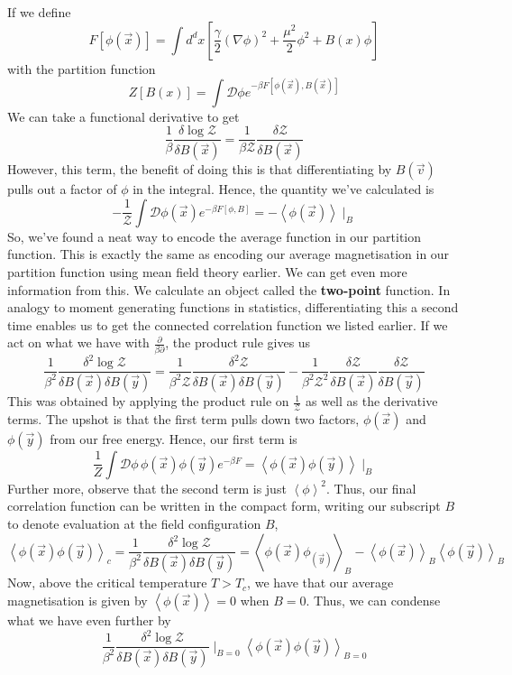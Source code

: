 \documentclass[11pt, oneside]{article}   	%
\begin{document}
If we define 
\[
	F[ \phi ( \vec{x} ) ] = \int d^{  d} x \left[ \frac{\gamma}{2 } ( \nabla \phi)^ 2 + \frac{\mu^2 }{2 } \phi^2 + B ( x) \phi  \right] 
\] with the partition function 
\[
	Z [ B ( x) ] = \int \mathcal{ D } \phi e^{  - \beta  F [ \phi ( \vec{x} ), B ( \vec{x} ) ]}
\] We can take a functional derivative to get
\[
	\frac{1}{\beta } \frac{\delta \log \mathcal{ Z }}{\delta B ( \vec{x} ) } = \frac{1}{\beta \mathcal{ Z }} \frac{ \delta \mathcal{ Z }}{ \delta B ( \vec{x} ) }
\] However, this term, the benefit of doing this is that differentiating by $B ( \vec{v} ) $ pulls out a factor of $ \phi $ in the integral. Hence, the quantity we've calculated is 
\[
	- \frac{1}{\mathcal{ Z } } \int \mathcal{ D } \phi ( \vec{x})  e^{  - \beta F[ \phi , B  ] } =  - \left< \phi ( \vec{x} )  \right> \mid_{ B }
\] So, we've found a neat way to encode the average function in our partition function. 
This is exactly the same as encoding our average magnetisation 
in our partition function using mean field theory earlier. 
We can get even more information from this. We calculate an object called the \textbf{two-point} function. 
In analogy to moment generating functions in statistics, 
differentiating this a second time enables us to get the connected 
correlation function we listed earlier. If we act on what we have 
with $  \frac{ \partial  }{ \beta \partial  }$, the product rule gives us 
\[
	\frac{1}{ \beta ^ 2 } \frac{\delta^ 2   \log \mathcal{  Z} }{\delta B ( \vec{x} ) \delta B ( \vec{y} ) } = \frac{1}{ \beta ^ 2 \mathcal{ Z } } \frac{ \delta ^2 \mathcal{ Z } }{\delta B ( \vec{x} ) \delta B ( \vec{y} ) }  - \frac{1}{ \beta ^ 2 \mathcal{Z } ^ 2 } \frac{ \delta \mathcal{ Z } }{ \delta B ( \vec{x} ) } \frac{ \delta \mathcal{ Z } }{ \delta B ( \vec{y}) } 
\] This was obtained by applying the product rule on $ \frac{1}{ \mathcal{ Z } } $ as 
well as the derivative terms. 
The upshot is that the first term pulls down two factors, $ \phi ( \vec{x} )  $ and $ \phi ( \vec{y} ) $ from our free energy. 
Hence, our first term is 
\[
	 \frac{1}{ Z }\int \mathcal{ D } \phi \, \phi ( \vec{x} ) \phi ( \vec{y} ) e^{  - \beta F } = \left< \phi ( \vec{x} ) \phi ( \vec{y} )  \right>\mid_B
\]  Further more, observe that the second term is just 
$ \left< \phi  \right>^ 2 $. 
Thus, our final correlation function can be written in the compact form, writing our subscript $ B $ to denote evaluation at the field configuration $ B $, 
\[
	\left< \phi ( \vec{x} ) \phi ( \vec{y} )  \right>_c  = \frac{1}{\beta ^ 2 } \frac{ \delta ^ 2 \log \mathcal{ Z } }{\delta B ( \vec{x} ) \delta B ( \vec{y} ) } = \left< \phi ( \vec{x} ) \phi_( \vec{y} )  \right>_B - \left<\phi( \vec{x} ) \right>_B \left< \phi( \vec{y} )  \right>_B 
\] Now, above the critical temperature $ T > T_{  c} $, we have that our average 
magnetisation is given by $ \left< \phi ( \vec{x} )  \right>  = 0 $ when $B = 0$. 
Thus, we can condense what we have even further by 
 \[
	 \frac{1}{ \beta ^ 2 } \frac{ \delta ^ 2 \log \mathcal{ Z }  }{\delta B ( \vec{x} )  \delta B ( \vec{y} ) }\mid_{ B  =0 } \left< \phi ( \vec{x} )\phi ( \vec{y} )   \right>_{ B = 0} 
\] 
\end{document}
